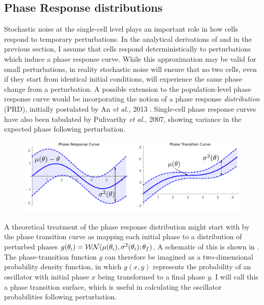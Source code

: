 \subsection{Phase Response distributions}

Stochastic noise at the single-cell level plays an important role in how cells respond to temporary perturbations.
In the analytical derivations of  and in the previous section, I assume that cells respond deterministically to perturbations which induce a phase response curve.
While this approximation may be valid for small perturbations, in reality stochastic noise will ensure that no two cells, even if they start from identical initial conditions, will experience the same phase change from a perturbation.
A possible extension to the population-level phase response curve would be incorporating the notion of a phase response {\itshape distribution} (PRD), initially postulated by An {\itshape et al.,} 2013 \cite{An2013}.
Single-cell phase response curves have also been tabulated by Pulivarthy {\itshape et al.,} 2007, showing variance in the expected phase following perturbation.

\begin{figure}[tbp]
  \centering
  \includegraphics[width=\textwidth]{chap7/figures/prd.pdf}
  \label{fig:prd-def}
\end{figure}

A theoretical treatment of the phase response distribution might start with by the phase transition curve as mapping each initial phase to a distribution of perturbed phases $g(\theta_i) = {\cal WN}(\mu(\theta_i), \sigma^2(\theta_i); \theta_f)$.
A schematic of this is shown in .
The phase-transition function $g$ can therefore be imagined as a two-dimensional probability density function, in which $g(x, y)$ represents the probability of an oscillator with initial phase $x$ being transformed to a final phase $y$.
I will call this a phase transition surface, which is useful in calculating the oscillator probabilities following perturbation.

